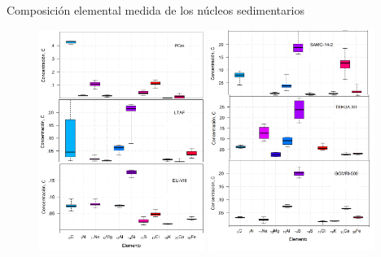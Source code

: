 \documentclass[9pt]{beamer}
\begin{document}
\begin{frame}{Composición elemental medida de los núcleos sedimentarios}
	\begin{figure}
		\centering
		\includegraphics[width=0.48\textwidth]{Imagenes/XRF_Todos_Los_Nucleos_1-1.png}
		\includegraphics[width=0.48\textwidth]{Imagenes/XRF_Todos_Los_Nucleos_2-1.png}
	\end{figure}
\end{frame}
\end{document}
